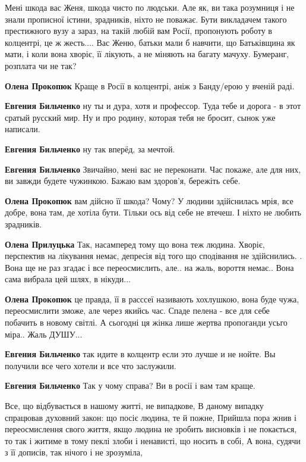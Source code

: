 \begin{itemize}

Мені шкода вас Женя, шкода чисто по людськи. Але як, ви така розумниця і не знали
прописної істини, зрадників, ніхто не поважає. Бути викладачем такого
престижного вузу а зараз, на такій любій вам Росії, пропонують роботу в
колцентрі, це ж жесть.... Вас Женю, батьки мали б навчити, що Батьківщина як
мати, і коли вона хворіє, її лікують, а не міняють на багату мачуху. Бумеранг,
розплата чи не так?

\begin{itemize} %
\textbf{Олена Прокопюк} Краще в Росії в колцентрі, аніж з Банду/ерою у вченій раді.

\textbf{Евгения Бильченко} ну ты и дура, хотя и профессор. Туда тебе и дорога - в этот сратый русский мир. Ну и про родину, которая тебя не бросит, сынок уже написали.

\textbf{Евгения Бильченко} ну так вперёд, за мечтой.

\textbf{Евгения Бильченко} Звичайно, мені вас не переконати. Час покаже, але для них, ви завжди будете чужинкою. Бажаю вам здоров'я, бережіть себе.

\textbf{Олена Прокопюк} вам дійсно її шкода? Чому? У людини здійснилась мрія, все добре, вона там, де хотіла бути. Тільки ось від себе не втечеш. І ніхто не любить зрадників.

\textbf{Олена Прилуцька} Так, насамперед тому що вона теж людина. Хворіє, перспектив на лікування немає, депресія від того що сподівання не здійснились. . Вона ще не раз згадає і все переосмислить, але.. на жаль, вороття немає.. Вона сама вибрала цей шлях, в нікуди...

\textbf{Олена Прокопюк} це правда, її в расссеї називають хохлушкою, вона буде чужа, переосмислити зможе, але через якийсь час. Спаде пелена - все для себе побачить в новому світлі. А сьогодні ця жінка лише жертва пропоганди усьго міра.. Жаль ДУШУ...

\textbf{Евгения Бильченко} так идите в колцентр если это лучше и не нойте. Вы получили все чего хотели и все что заслужили.

\textbf{Евгения Бильченко} Так у чому справа? Ви в росії і вам там краще.


Все, що відбувається в нашому житті, не випадкове, В даному випадку спрацював
духовний закон: що посіє людина, те й пожне, Прийшла пора жнив і переосмислення
свого життя, якщо людина не зробить висновків і не покається, то так і житиме в
тому пеклі злоби і ненависті, що носить в собі, А вона, судячи з її дописів,
так нічого і не зрозуміла,



\end{itemize}
\end{itemize}
